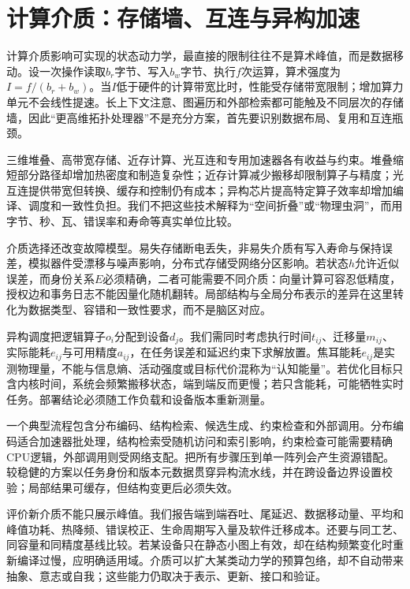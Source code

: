 \section{计算介质：存储墙、互连与异构加速}
\label{sec:silicon_medium_phase_transition}

计算介质影响可实现的状态动力学，最直接的限制往往不是算术峰值，而是数据移动。设一次操作读取$b_r$字节、写入$b_w$字节、执行$f$次运算，算术强度为$I=f/(b_r+b_w)$。当$I$低于硬件的计算带宽比时，性能受存储带宽限制；增加算力单元不会线性提速。长上下文注意、图遍历和外部检索都可能触及不同层次的存储墙，因此“更高维拓扑处理器”不是充分方案，首先要识别数据布局、复用和互连瓶颈。

三维堆叠、高带宽存储、近存计算、光互连和专用加速器各有收益与约束。堆叠缩短部分路径却增加热密度和制造复杂性；近存计算减少搬移却限制算子与精度；光互连提供带宽但转换、缓存和控制仍有成本；异构芯片提高特定算子效率却增加编译、调度和一致性负担。我们不把这些技术解释为“空间折叠”或“物理虫洞”，而用字节、秒、瓦、错误率和寿命等真实单位比较。

介质选择还改变故障模型。易失存储断电丢失，非易失介质有写入寿命与保持误差，模拟器件受漂移与噪声影响，分布式存储受网络分区影响。若状态$h$允许近似误差，而身份关系$E$必须精确，二者可能需要不同介质：向量计算可容忍低精度，授权边和事务日志不能因量化随机翻转。局部结构与全局分布表示的差异在这里转化为数据类型、容错和一致性要求，而不是脑区对应。

异构调度把逻辑算子$o_i$分配到设备$d_j$。我们需同时考虑执行时间$t_{ij}$、迁移量$m_{ij}$、实际能耗$e_{ij}$与可用精度$a_{ij}$，在任务误差和延迟约束下求解放置。焦耳能耗$e_{ij}$是实测物理量，不能与信息熵、活动强度或目标代价混称为“认知能量”。若优化目标只含内核时间，系统会频繁搬移状态，端到端反而更慢；若只含能耗，可能牺牲实时任务。部署结论必须随工作负载和设备版本重新测量。

一个典型流程包含分布编码、结构检索、候选生成、约束检查和外部调用。分布编码适合加速器批处理，结构检索受随机访问和索引影响，约束检查可能需要精确CPU逻辑，外部调用则受网络支配。把所有步骤压到单一阵列会产生资源错配。较稳健的方案以任务身份和版本元数据贯穿异构流水线，并在跨设备边界设置校验；局部结果可缓存，但结构变更后必须失效。

评价新介质不能只展示峰值。我们报告端到端吞吐、尾延迟、数据移动量、平均和峰值功耗、热降频、错误校正、生命周期写入量及软件迁移成本。还要与同工艺、同容量和同精度基线比较。若某设备只在静态小图上有效，却在结构频繁变化时重新编译过慢，应明确适用域。介质可以扩大某类动力学的预算包络，却不自动带来抽象、意志或自我；这些能力仍取决于表示、更新、接口和验证。

